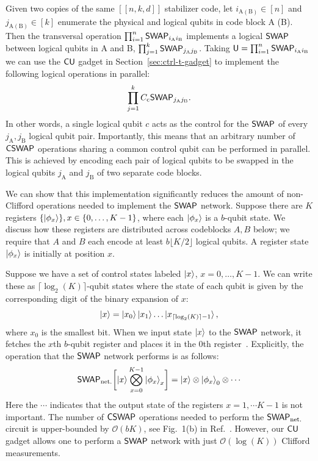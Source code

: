 \documentclass[11pt]{article}
\begin{document}
Given two copies of the same $[[n,k,d]]$ stabilizer code, let $i_\mathrm{A (B)}\in[n]$ and $j_\mathrm{A (B)}\in [k]$ enumerate the physical and logical qubits in code block A (B).
Then the transversal operation $\prod_{i=1}^n\mathsf{SWAP} _{i_\mathrm{A}i_{\mathrm{B}}}$ implements a logical $\mathsf{SWAP}$ between logical qubits in A and B, $ \prod_{j=1}^k\mathsf{SWAP}_{j_\mathrm{A}j_{\mathrm{B}}}$. 
Taking $\mathsf{U} = \prod_{i=1}^n\mathsf{SWAP} _{i_\mathrm{A}i_{\mathrm{B}}}$ we can use the $\mathsf{CU}$ gadget in Section~\ref{sec:ctrl-t-gadget} to implement the following logical operations in parallel:
\begin{align}
    \prod_{j=1}^k C_{\mathrm{c}}\mathsf{SWAP} _{j_\mathrm{A}j_\mathrm{B}}.
\end{align}
In other words, a single logical qubit $c$ acts as the control for the $\mathsf{SWAP}$ of every $j_\mathrm{A},j_{\mathrm{B}}$ logical qubit pair.
Importantly, this means that an arbitrary number of $\mathsf{CSWAP}$ operations sharing a common control qubit can be performed in parallel. This is achieved by encoding each pair of logical qubits to be swapped in the logical qubits $j_\mathrm{A}$ and $j_\mathrm{B}$ of two separate code blocks.

We can show that this implementation significantly reduces the amount of non-Clifford operations needed to implement the $\mathsf{SWAP}$ network.
Suppose there are $K$ registers $\{\ket{\phi_x} \}, x \in \{0, \dots, K-1\}$, where each $\ket{\phi_x}$ is a $b$-qubit state. We discuss how these registers are distributed across codeblocks $A, B$ below; we require that $A$ and $B$ each encode at least $b \lfloor K/2 \rfloor$ logical qubits. A register state $\ket{\phi_x}$ is initially at position $x$.

Suppose we have a set of control states labeled $\ket{x}$, $x = 0, \dots, K-1$. We can write these as $\lceil \log_2(K) \rceil$-qubit states where the state of each qubit is given by the corresponding digit of the binary expansion of $x$: 
$$\ket{x}= \ket{x_0} \ket{x_1} \dots \ket{x_{\lceil \log_2(K) \rceil-1}},$$
where $x_0$ is the smallest bit.
When we input state $\ket{x}$ to the $\mathsf{SWAP}$ network, it fetches the $x$th $b$-qubit register and places it in the $0$th register~\cite{Low_2024}. Explicitly, the operation that the $\mathsf{SWAP}$ network performs is as follows:
\begin{align}
    \mathsf{SWAP}_{\rm{net.}} \biggl[\ket{x} \bigotimes _{x=0}^{K-1}\ket{\phi_x}_x\biggr]= \ket{x}\otimes \ket{\phi_x}_0\otimes \cdots 
\end{align}
Here the $\cdots$ indicates that the output state of the registers $x=1,\cdots K-1$ is not important.
The number of $\mathsf{CSWAP}$ operations needed to perform the $\mathsf{SWAP}_{\rm{net.}}$ circuit is upper-bounded by $\mathcal{O}(bK)$, see Fig.~1(b) in Ref.~\cite{Low_2024}.
However, our $\mathsf{CU}$ gadget allows one to perform a $\mathsf{SWAP}$ network with just $\mathcal{O}(\log(K))$ Clifford measurements.
\end{document}
